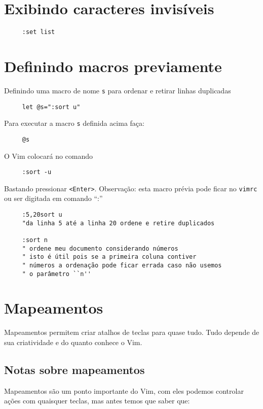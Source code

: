 \section{Exibindo caracteres invisíveis}
\label{Exibindo caracteres invisíveis}

\begin{verbatim}
     :set list
\end{verbatim}

\section{Definindo macros previamente}
\label{Definindo macros previamente}
Definindo uma macro de nome \verb|s| para ordenar e retirar linhas duplicadas

\begin{verbatim}
     let @s=":sort u"
\end{verbatim}

Para executar a macro \verb|s| definida acima faça:

\begin{verbatim}
     @s
\end{verbatim}

O Vim colocará no comando

\begin{verbatim}
     :sort -u
\end{verbatim}

Bastando pressionar \verb|<Enter>|.
Observação: esta macro prévia pode ficar no {\tt vimrc} ou ser digitada em comando ``:''


\begin{verbatim}
     :5,20sort u
     "da linha 5 até a linha 20 ordene e retire duplicados
     
     :sort n
     " ordene meu documento considerando números
     " isto é útil pois se a primeira coluna contiver
     " números a ordenação pode ficar errada caso não usemos
     " o parâmetro ``n''
\end{verbatim}

\section{Mapeamentos}\label{Mapeamentos}

Mapeamentos permitem criar atalhos de teclas para quase tudo. Tudo depende de
sua criatividade e do quanto conhece o Vim. 


\subsection{Notas sobre mapeamentos}\label{Notas sobre mapeamentos}
Mapeamentos são um ponto importante do Vim, com eles podemos controlar
ações com quaisquer teclas, mas antes temos que saber que:

